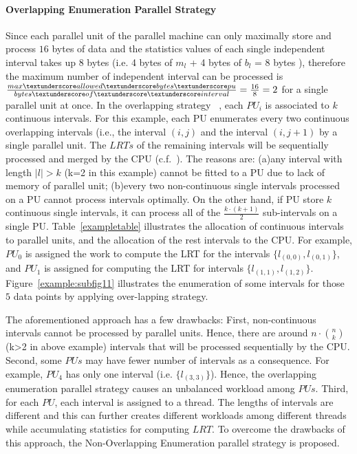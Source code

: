 \documentclass[AMA,LATO1COL]{WileyNJD-v2}
\begin{document}
\paragraph{Overlapping Enumeration Parallel Strategy}
Since each parallel unit of the parallel machine can only maximally store and process $16$ bytes of data and the statistics values of each single independent interval takes up $8$ bytes (i.e. 4 bytes of $m_l$ + 4 bytes of $b_l$ = 8 bytes ), therefore the maximum number of independent interval can be processed is $\frac{max\textunderscore allowed \textunderscore bytes\textunderscore pu }{bytes\textunderscore of\textunderscore \textunderscore interval}=\frac{16}{8}=2$ for a single parallel unit at once. In the overlapping strategy ~\cite{apweb}, each $PU_i$ is associated to $k$ continuous intervals. For this example, each PU enumerates every two continuous overlapping intervals (i.e., the interval $(i,j)$ and the interval $(i,j+1)$ by a single parallel unit.  The $LRTs$ of the remaining intervals will be sequentially processed and merged by the CPU (c.f.~\cite{apweb}). The reasons are: (a)any interval with length $|l|>k$ (k=2 in this example) cannot be fitted to a PU due to lack of memory of parallel unit; (b)every two non-continuous single intervals processed on a PU cannot process intervals optimally. On the other hand, if PU store $k$ continuous single intervals, it can process all of the ${\frac{k \cdot (k+1)}{2}}$ sub-intervals on a single PU. Table~\ref{exampletable} illustrates the allocation of continuous intervals to parallel units, and the allocation of the rest intervals to the CPU.  For example, $PU_0$ is assigned the work to compute the LRT for the intervals $\{l_{(0,0)},l_{(0,1)}\}$, and $PU_1$ is assigned for computing the LRT for intervals $\{l_{(1,1)},l_{(1,2)}\}$. Figure~\ref{example:subfig11} illustrates the enumeration of some intervals for those $5$ data points by applying over-lapping strategy.

The aforementioned approach has a few drawbacks: First, non-continuous intervals cannot be processed by parallel units. Hence, there are around $n\cdot {n \choose k}$ (k>2 in above example) intervals that will be processed sequentially by the CPU. Second, some $PUs$ may have fewer number of intervals as a consequence. For example, $PU_4$ has only one interval (i.e. $\{l_{(3,3)}\}$). Hence, the overlapping enumeration parallel strategy causes an unbalanced workload among $PUs$.  Third, for each $PU$, each interval is assigned to a thread. The lengths of intervals are different and this can further creates different workloads among different threads while accumulating statistics for computing $LRT$. To overcome the drawbacks of this approach, the Non-Overlapping Enumeration parallel strategy is proposed.
\end{document}
